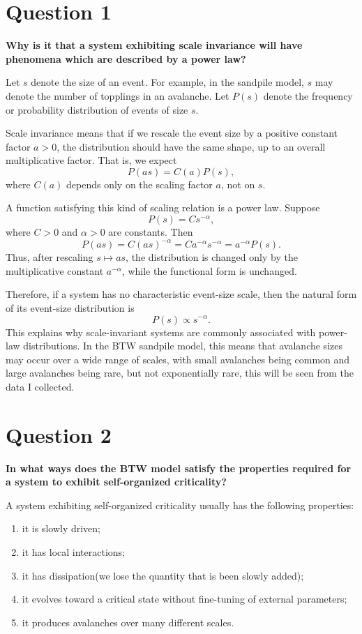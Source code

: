 \section*{Question 1}

\textbf{Why is it that a system exhibiting scale invariance will have phenomena which are described by a power law?}

Let $s$ denote the size of an event. For example, in the sandpile model, $s$ may denote the number of topplings in an avalanche. Let $P(s)$ denote the frequency or probability distribution of events of size $s$.

Scale invariance means that if we rescale the event size by a positive constant factor $a>0$, the distribution should have the same shape, up to an overall multiplicative factor. That is, we expect
\[
    P(as)=C(a)P(s),
\]
where $C(a)$ depends only on the scaling factor $a$, not on $s$.

A function satisfying this kind of scaling relation is a power law. Suppose
\[
    P(s)=Cs^{-\alpha},
\]
where $C>0$ and $\alpha>0$ are constants. Then
\[
    P(as)=C(as)^{-\alpha}
    =Ca^{-\alpha}s^{-\alpha}
    =a^{-\alpha}P(s).
\]
Thus, after rescaling $s\mapsto as$, the distribution is changed only by the multiplicative constant $a^{-\alpha}$, while the functional form is unchanged.

Therefore, if a system has no characteristic event-size scale, then the natural form of its event-size distribution is
\[
    P(s)\propto s^{-\alpha}.
\]
This explains why scale-invariant systems are commonly associated with power-law distributions. In the BTW sandpile model, this means that avalanche sizes may occur over a wide range of scales, with small avalanches being common and large avalanches being rare, but not exponentially rare, this will be seen from the data I collected.

\section*{Question 2}

\textbf{In what ways does the BTW model satisfy the properties required for a system to exhibit self-organized criticality?}

A system exhibiting self-organized criticality usually has the following properties:

\begin{enumerate}[label=(\roman*)]
    \item it is slowly driven;
    \item it has local interactions;
    \item it has dissipation(we lose the quantity that is been slowly added);
    \item it evolves toward a critical state without fine-tuning of external parameters;
    \item it produces avalanches over many different scales.
\end{enumerate}

